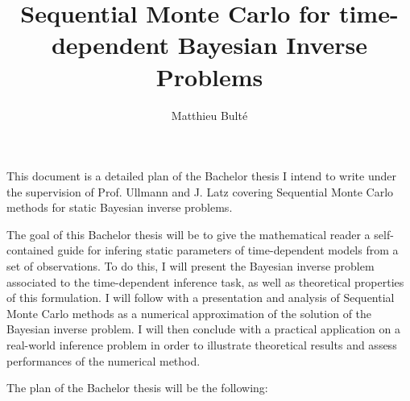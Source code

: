 \documentclass{article}
\begin{document}
\date{}
\title{Sequential Monte Carlo for time-dependent Bayesian Inverse Problems}
\author{Matthieu Bulté}
\maketitle

This document is a detailed plan of the Bachelor thesis I intend to write under the supervision of Prof. Ullmann and J. Latz covering Sequential Monte Carlo methods for static Bayesian inverse problems.

The goal of this Bachelor thesis will be to give the mathematical reader a self-contained guide for infering static parameters of time-dependent models from a set of observations. To do this, I will present the Bayesian inverse problem associated to the time-dependent inference task, as well as theoretical properties of this formulation. I will follow with a presentation and analysis of Sequential Monte Carlo methods as a numerical approximation of the solution of the Bayesian inverse problem. I will then conclude with a practical application on a real-world inference problem in order to illustrate theoretical results and assess performances of the numerical method.

The plan of the Bachelor thesis will be the following:
\end{document}
